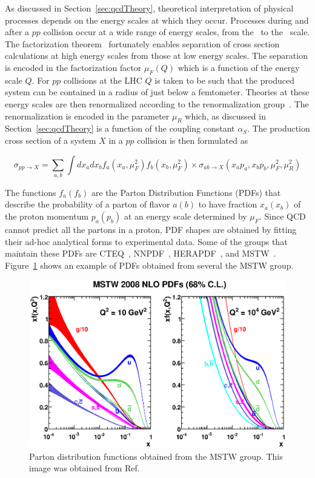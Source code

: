 \par As discussed in Section~\ref{sec:qcdTheory}, theoretical interpretation of physical processes depends
 on the energy scales at which they occur. Processes during and after a $pp$ collision occur at a 
wide range of energy scales, from the \TeV\ to the \MeV\ scale.   
The factorization theorem~\cite{Collins:1989gx} fortunately enables separation of cross section calculations at high 
energy scales from those at low energy scales. The separation is encoded in the factorization 
factor $\mu_F(Q)$ which is a function of the energy scale $Q$. For $pp$ collisions 
at the LHC $Q$ is taken to be such that the produced system can be contained in a radius of just 
below a femtometer. Theories at these energy scales are then renormalized according to the 
renormalization group~\cite{Sonoda:2006rr}. The renormalization is encoded in the parameter $\mu_R$ which, as discussed 
in Section~\ref{sec:qcdTheory} is a function of the coupling constant $\alpha_S$. The production cross section 
of a system $X$ in a $pp$ collision is then formulated as  

\begin{equation}
\sigma_{pp\to X} = \sum_{a,b}\int dx_adx_bf_a(x_a,\mu_F^2)f_b(x_b,\mu_F^2)\times\sigma_{ab\to X}(x_ap_a,x_bp_b,\mu_F^2,\mu_R^2)
\label{eq:xs}
\end{equation}

The functions $f_a(f_b)$ are the Parton Distribution Functions (PDFs) that describe the probability of a parton of 
flavor $a(b)$ to have fraction $x_a(x_b)$ of the proton momentum $p_a(p_b)$ at an energy scale determined by $\mu_F$.
Since QCD cannot predict all the partons in a proton, PDF shapes are obtained by fitting their ad-hoc analytical forms to 
experimental data. Some of the groups that maintain these PDFs are CTEQ~\cite{Kovarik:2013sya}, 
NNPDF~\cite{Ball:2013hta}, HERAPDF~\cite{Kretzschmar:2009ws}, and MSTW~\cite{Watt:2012np}. 
Figure~\ref{fig:pdfs} shows an example of PDFs obtained from several the MSTW group. 

\begin{figure}[h]
   \includegraphics[width=\textwidth]{figures/mstw2008nlo68cl_allpdfs.eps}
\caption{Parton distribution functions obtained from the MSTW group. 
This image was obtained from Ref.~\cite{Martin:2009iq}}
\label{fig:pdfs}
\end{figure}

